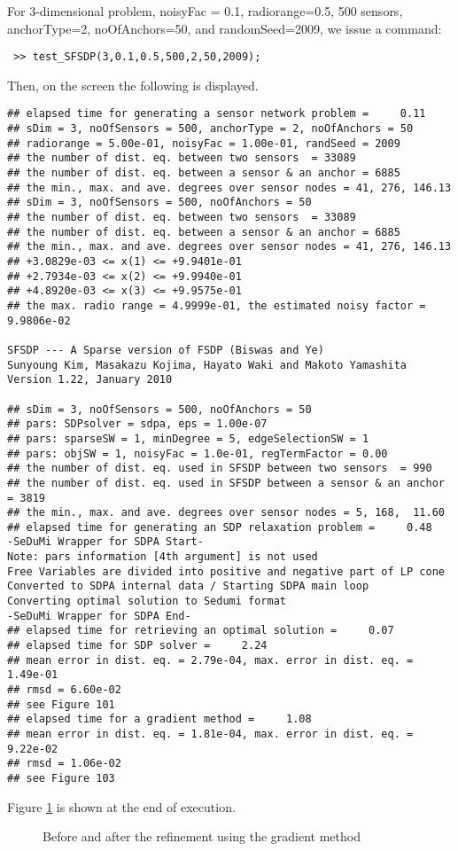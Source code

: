 \documentclass[12pt]{article}
\begin{document}
For 3-dimensional problem, 
noisyFac = 0.1, radiorange=0.5, 500 sensors, anchorType=2, noOfAnchors=50, and 
randomSeed=2009, we issue a command:
\begin{verbatim}
 >> test_SFSDP(3,0.1,0.5,500,2,50,2009);
\end{verbatim}
Then, on the screen the following is displayed.
\begin{verbatim}
## elapsed time for generating a sensor network problem =     0.11
## sDim = 3, noOfSensors = 500, anchorType = 2, noOfAnchors = 50
## radiorange = 5.00e-01, noisyFac = 1.00e-01, randSeed = 2009
## the number of dist. eq. between two sensors  = 33089
## the number of dist. eq. between a sensor & an anchor = 6885
## the min., max. and ave. degrees over sensor nodes = 41, 276, 146.13
## sDim = 3, noOfSensors = 500, noOfAnchors = 50
## the number of dist. eq. between two sensors  = 33089
## the number of dist. eq. between a sensor & an anchor = 6885
## the min., max. and ave. degrees over sensor nodes = 41, 276, 146.13
## +3.0829e-03 <= x(1) <= +9.9401e-01
## +2.7934e-03 <= x(2) <= +9.9940e-01
## +4.8920e-03 <= x(3) <= +9.9575e-01
## the max. radio range = 4.9999e-01, the estimated noisy factor = 9.9806e-02

SFSDP --- A Sparse version of FSDP (Biswas and Ye)
Sunyoung Kim, Masakazu Kojima, Hayato Waki and Makoto Yamashita
Version 1.22, January 2010

## sDim = 3, noOfSensors = 500, noOfAnchors = 50
## pars: SDPsolver = sdpa, eps = 1.00e-07
## pars: sparseSW = 1, minDegree = 5, edgeSelectionSW = 1
## pars: objSW = 1, noisyFac = 1.0e-01, regTermFactor = 0.00
## the number of dist. eq. used in SFSDP between two sensors  = 990
## the number of dist. eq. used in SFSDP between a sensor & an anchor = 3819
## the min., max. and ave. degrees over sensor nodes = 5, 168,  11.60
## elapsed time for generating an SDP relaxation problem =     0.48
-SeDuMi Wrapper for SDPA Start-
Note: pars information [4th argument] is not used
Free Variables are divided into positive and negative part of LP cone
Converted to SDPA internal data / Starting SDPA main loop
Converting optimal solution to Sedumi format
-SeDuMi Wrapper for SDPA End-
## elapsed time for retrieving an optimal solution =     0.07
## elapsed time for SDP solver =     2.24
## mean error in dist. eq. = 2.79e-04, max. error in dist. eq. = 1.49e-01
## rmsd = 6.60e-02
## see Figure 101
## elapsed time for a gradient method =     1.08
## mean error in dist. eq. = 1.81e-04, max. error in dist. eq. = 9.22e-02
## rmsd = 1.06e-02
## see Figure 103
 \end{verbatim}
 Figure \ref{EG3} is shown at the end of execution.
\begin{figure}
  \hspace{1mm}
\caption{Before and after the refinement using the gradient method}
\label{EG3}
\end{figure}
\end{document}
